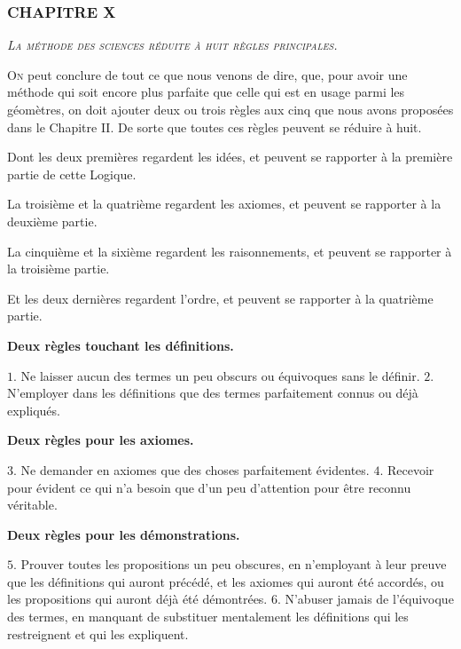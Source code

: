 \subsubsection{\centering \Large CHAPITRE X}
\begin{center}\emph{\large\scshape La méthode des sciences réduite à huit règles principales.}\end{center}


	\lettrine{O}{n} peut conclure de tout ce que nous venons de dire, que, pour avoir une méthode qui soit encore plus parfaite que celle qui est en usage parmi les géomètres, on doit ajouter deux ou trois règles aux cinq que nous avons proposées dans le Chapitre II. De sorte que toutes ces règles peuvent se réduire à huit.

Dont les deux premières regardent les idées, et peuvent se rapporter à la première partie de cette Logique.

La troisième et la quatrième regardent les axiomes, et peuvent se rapporter à la deuxième partie.

La cinquième et la sixième regardent les raisonnements, et peuvent se rapporter à la troisième partie.

Et les deux dernières regardent l'ordre, et peuvent se rapporter à la quatrième partie.


\begin{center}\textbf{Deux règles touchant les définitions.}\end{center}

$1$. Ne laisser aucun des termes un peu obscurs ou équivoques sans le définir.
\smallbreak
$2$. N'employer dans les définitions que des termes parfaitement connus ou déjà expliqués.

\begin{center}\textbf{Deux règles pour les axiomes.}\end{center}

$3$. Ne demander en axiomes que des choses parfaitement évidentes.
\smallbreak
$4$. Recevoir pour évident ce qui n'a besoin que d'un peu d'attention pour être reconnu véritable.

\begin{center}\textbf{Deux règles pour les démonstrations.}\end{center}

$5$. Prouver toutes les propositions un peu obscures, en n'employant à leur preuve que les définitions qui auront précédé, et les axiomes qui auront été accordés, ou les propositions qui auront déjà été démontrées.
\smallbreak
$6$. N'abuser jamais de l'équivoque des termes, en manquant de substituer mentalement les définitions qui les restreignent et qui les expliquent.

